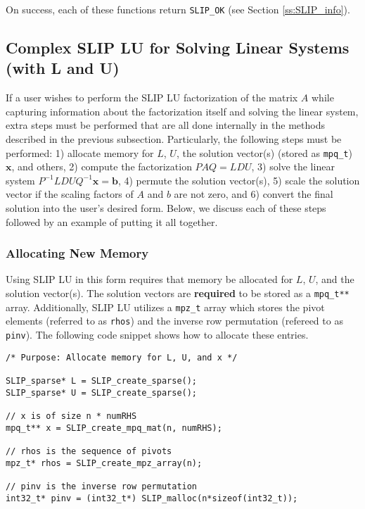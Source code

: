 \documentclass[11pt]{article}
\theoremstyle{definition}
\begin{document}
On success, each of these functions return \verb|SLIP_OK| (see Section \ref{ss:SLIP_info}).


\cprotect\subsection{Complex SLIP LU for Solving Linear Systems (with L and U)} \label{s:Using:hard}

If a user wishes to perform the SLIP LU factorization of the matrix $A$ while capturing information about the factorization itself and solving the linear system, extra steps must be performed that are all done internally in the methods described in the previous subsection. Particularly, the following steps must be performed: 1) allocate memory for $L$, $U$, the solution vector(s) (stored as \verb|mpq_t|) $\mathbf{x}$, and others, 2) compute the factorization $PAQ = L D U$, 3) solve the linear system $P^{-1} L D U Q^{-1} \mathbf{x} = \mathbf{b}$, 4) permute the solution vector(s), 5) scale the solution vector if the scaling factors of $A$ and $b$ are not zero, and 6) convert the final solution into the user's desired form. Below, we discuss each of these steps followed by an example of putting it all together.

\subsubsection{Allocating New Memory}

Using SLIP LU in this form requires that memory be allocated for $L$, $U$, and the solution vector(s). The solution vectors are \textbf{required} to be stored as a \verb|mpq_t**| array. Additionally, SLIP LU utilizes a \verb|mpz_t| array which stores the pivot elements (referred to as \verb|rhos|) and the inverse row permutation (refereed to as \verb|pinv|). The following code snippet shows how to allocate these entries.

\begin{verbatim}
/* Purpose: Allocate memory for L, U, and x */

SLIP_sparse* L = SLIP_create_sparse();
SLIP_sparse* U = SLIP_create_sparse();

// x is of size n * numRHS
mpq_t** x = SLIP_create_mpq_mat(n, numRHS);

// rhos is the sequence of pivots
mpz_t* rhos = SLIP_create_mpz_array(n);

// pinv is the inverse row permutation
int32_t* pinv = (int32_t*) SLIP_malloc(n*sizeof(int32_t));

\end{verbatim}
\end{document}
